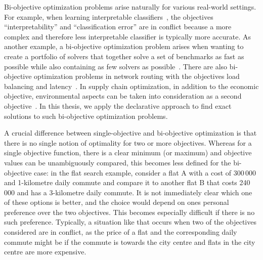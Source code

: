 Bi-objective optimization problems arise naturally for various real-world settings.
For example, when learning interpretable classifiers~\autocites{DBLP:conf/ijcai/Ignatiev0NS21,DBLP:conf/cp/MaliotovM18,DBLP:conf/ijcai/NarodytskaIPM18,DBLP:conf/ijcai/Hu0HH20,DBLP:journals/corr/abs-2010-09919,DBLP:conf/cp/YuISB20,DBLP:conf/aaai/Ignatiev0S021,DBLP:conf/cade/IgnatievPNM18}, the objectives ``interpretability'' and ``classification error'' are in conflict because a more complex and therefore less interpretable classifier is typically more accurate.
As another example, a bi-objective optimization problem arises when wanting to create a portfolio of solvers that together solve a set of benchmarks as fast as possible while also containing as few solvers as possible~\autocite{DBLP:conf/cp/JanotaMSM21}.
There are also bi-objective optimization problems in network routing with the objectives load balancing and latency~\autocite{SilverioEtAl2022biobjectiveoptimization}.
In supply chain optimization, in addition to the economic objective, environmental aspects can be taken into consideration as a second objective~\autocites{DBLP:journals/cce/Pinto-VarelaBN11,DBLP:journals/candie/TautenhainBN19}.
In this thesis, we apply the declarative approach to find exact solutions to such bi-objective optimization problems.

A crucial difference between single-objective and bi-objective optimization is that there is no single notion of optimality for two or more objectives.
Whereas for a single objective function, there is a clear minimum (or maximum) and objective values can be unambiguously compared, this becomes less defined for the bi-objective case:
in the flat search example, consider a flat A with a cost of 300\,000 \texteuro{} and 1-kilometre daily commute and compare it to another flat B that costs 240\,000 \texteuro{} and has a 3-kilometre daily commute.
It is not immediately clear which one of these options is better, and the choice would depend on ones personal preference over the two objectives.
This becomes especially difficult if there is no such preference.
Typically, a situation like that occurs when two of the objectives considered are in conflict, as the price of a flat and the corresponding daily commute might be if the commute is towards the city centre and flats in the city centre are more expensive.

